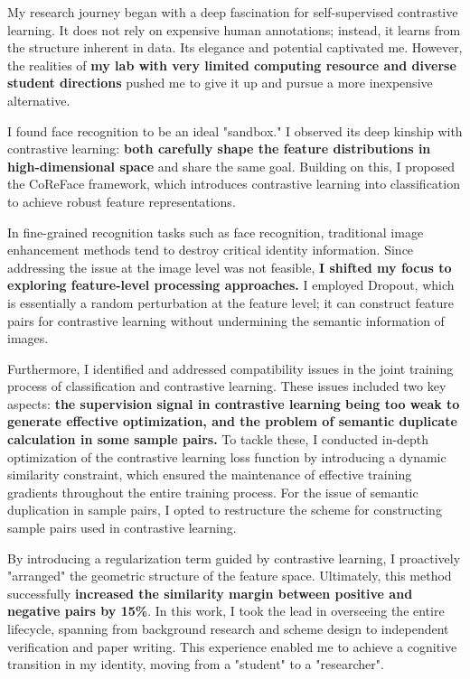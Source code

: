 \documentclass[11pt, letterpaper]{article}
\let\oldtextbf\textbf
\renewcommand{\textbf}[1]{{\color{black}\oldtextbf{#1}}}
\begin{document}
My research journey began with a deep fascination for self-supervised contrastive learning. It does not rely on expensive human annotations; instead, it learns from the structure inherent in data. Its elegance and potential captivated me. However, the realities of \textbf{my lab with very limited computing resource and diverse student directions} pushed me to give it up and pursue a more inexpensive alternative.

I found face recognition to be an ideal "sandbox." I observed its deep kinship with contrastive learning: \textbf{both carefully shape the feature distributions in high-dimensional space} and share the same goal. Building on this, I proposed the CoReFace framework, which introduces contrastive learning into classification to achieve robust feature representations.

In fine-grained recognition tasks such as face recognition, traditional image enhancement methods tend to destroy critical identity information. Since addressing the issue at the image level was not feasible, \textbf{I shifted my focus to exploring feature-level processing approaches.} I employed Dropout, which is essentially a random perturbation at the feature level; it can construct feature pairs for contrastive learning without undermining the semantic information of images.

Furthermore, I identified and addressed compatibility issues in the joint training process of classification and contrastive learning. These issues included two key aspects: \textbf{the supervision signal in contrastive learning being too weak to generate effective optimization, and the problem of semantic duplicate calculation in some sample pairs.} To tackle these, I conducted in-depth optimization of the contrastive learning loss function by introducing a dynamic similarity constraint, which ensured the maintenance of effective training gradients throughout the entire training process. For the issue of semantic duplication in sample pairs, I opted to restructure the scheme for constructing sample pairs used in contrastive learning.

By introducing a regularization term guided by contrastive learning, I proactively "arranged" the geometric structure of the feature space. Ultimately, this method successfully \textbf{increased the similarity margin between positive and negative pairs by 15\%}. In this work, I took the lead in overseeing the entire lifecycle, spanning from background research and scheme design to independent verification and paper writing. This experience enabled me to achieve a cognitive transition in my identity, moving from a "student" to a "researcher".
\end{document}

